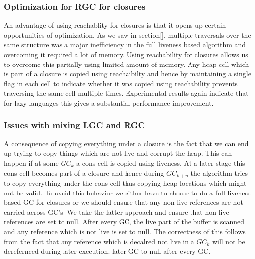 \documentclass[9pt]{sigplanconf}
\newcommand{\comment}[1]{{\color{Myblue}{(#1)}}}
\begin{document}
\subsubsection{Optimization for RGC for closures}
An advantage of using reachablity for closures is that it opens up 
certain opportunities of optimization. As we saw in section[], multiple 
traversals over the same structure was a major inefficiency in the full 
liveness based algorithm and overcoming it required a lot of memory.
Using reachability for closures allows us to overcome this partially 
using limited amount of memory. Any heap cell which is part of a closure 
is copied using reachaibilty and hence by maintaining a single flag in each 
cell to indicate whether it was copied using reachability prevents 
traversing the same cell multiple times. Experimental results again 
indicate that for lazy languages this gives a substantial performance 
improvement.
\comment{Maybe add a diagram}

\subsubsection{Issues with mixing LGC and RGC}
A consequence of  copying everything under a closure  is the fact that
we can end up trying to copy things which are not live and corrupt the
heap. This  can happen if at some  $GC_k$ a cons cell  is copied using
liveness. At  a later stage this  cons cell becomes part  of a closure
and  hence during $GC_{k+n}$  the algorithm  tries to  copy everything
under the  cons cell  thus copying heap  locations which might  not be
valid.  To avoid  this behavior we either have to choose  to do a full
liveness based  GC for closures or  we should ensure  that any non-live
references are  not carried across  GC's. We take the  latter approach
and ensure that  non-live references are set to  null. After every GC,
the live part of the buffer  is scanned and any reference which is not
live is  set to null.  The correctness of  this follows from  the fact
that any reference which is decalred  not live in a $GC_k$ will not be
derefernced during later execution.
later GC
to null after every GC.
\end{document}
